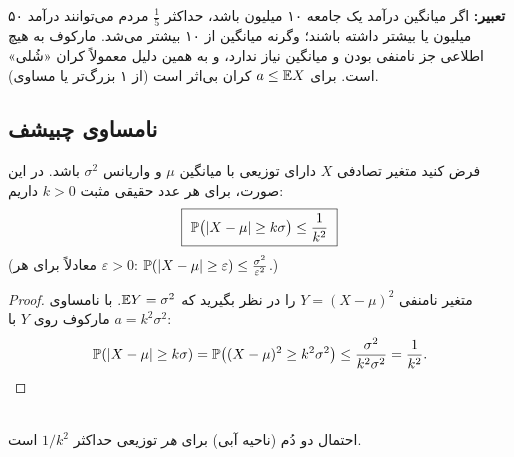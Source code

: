 \begin{note}
\notetitle \textbf{تعبیر:} اگر میانگین درآمد یک جامعه ۱۰ میلیون باشد، حداکثر $\frac1{5}$ مردم می‌توانند درآمد ۵۰ میلیون یا بیشتر داشته باشند؛ وگرنه میانگین از ۱۰ بیشتر می‌شد. مارکوف به هیچ اطلاعی جز نامنفی بودن و میانگین نیاز ندارد، و به همین دلیل معمولاً کران «شُلی» است. برای $a\le\mathbb{E} X$ کران بی‌اثر است (از ۱ بزرگ‌تر یا مساوی).
\end{note}

\subsection{نامساوی چبیشف }
\begin{theorem}
فرض کنید متغیر تصادفی $X$ دارای توزیعی با میانگین $\mu$ و واریانس $\sigma^2$ باشد. در این صورت، برای هر عدد حقیقی مثبت $k>0$ داریم:
\[
\boxed{\ \mathbb{P}\big(|X-\mu|\ge k\sigma\big)\le\frac{1}{k^2}\ }
\]
(معادلاً برای هر $\varepsilon>0$: $\mathbb{P}(|X-\mu|\ge\varepsilon)\le\frac{\sigma^2}{\varepsilon^2}$.)
\end{theorem}
\begin{proof}
متغیر نامنفی $Y=(X-\mu)^2$ را در نظر بگیرید که $\mathbb{E} Y=\sigma^2$. با نامساوی مارکوف روی $Y$ با $a=k^2\sigma^2$:
\[
\mathbb{P}(|X-\mu|\ge k\sigma)=\mathbb{P}\big((X-\mu)^2\ge k^2\sigma^2\big)\le\frac{\sigma^2}{k^2\sigma^2}=\frac1{k^2}.
\]
\end{proof}

\begin{center}
\\
{\small احتمال دو دُم (ناحیه آبی) برای \emph{هر} توزیعی حداکثر $1/k^2$ است.}
\end{center}

